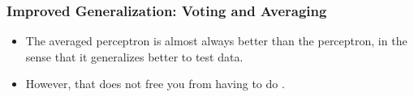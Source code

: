 \documentclass[trans]{beamer}
\begin{document}
\begin{frame}
  \frametitle{Improved Generalization: Voting and Averaging}
\begin{itemize}
\item 
The averaged perceptron is almost always better than the perceptron,
in the sense that it generalizes better to test data. 
\item However, that
does not free you from having to do .  
\end{itemize}
\end{frame}
\end{document}
